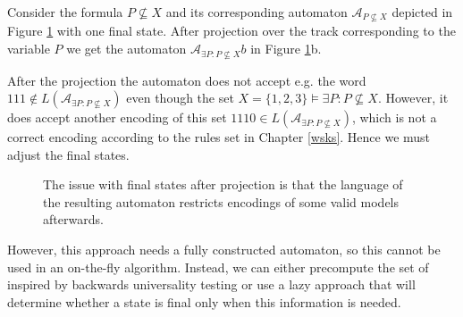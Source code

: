 \noindent\hrulefill
\begin{example}
 Consider the formula $P \not\subseteq X$ and its corresponding automaton
 $\mathcal{A}_{P \not\subseteq X}$ depicted in Figure \ref{projection} with one
 final state.
 After projection over the track corresponding to the variable $P$ we get the
 automaton $\mathcal{A}_{\exists P: P \not\subseteq X}b$ in Figure
 \ref{projection}b.
 
 After the projection the automaton does not accept e.g. the word $111 \notin
 L(\mathcal{A}_{\exists P: P \not\subseteq X})$ even though the set $X = \{1, 2,
 3\} \models \exists P: P \not\subseteq X$. However, it does accept another
 encoding of this set $1110 \in L(\mathcal{A}_{\exists P: P \not\subseteq X})$,
 which is not a correct encoding according to the rules set in Chapter
 \ref{wsks}. Hence we must adjust the final states.
 
 \begin{figure}[h!]
  \begin{center}
  \end{center}
  \caption{The issue with final states after projection is that
  the language of the resulting automaton restricts encodings
  of some valid models afterwards.}\label{projection}
 \end{figure}\label{models}
\end{example}
\noindent\hrulefill

However, this approach needs a fully constructed automaton, so this cannot be
used in an on-the-fly algorithm. Instead, we can either precompute the set of
inspired by backwards universality testing \cite{backwards-universality} or use
a lazy approach that will determine whether a state is final only when this
information is needed.

